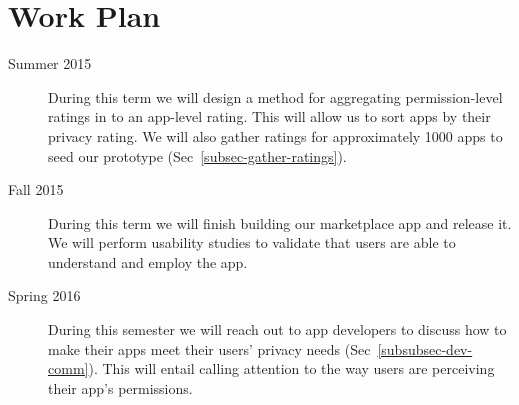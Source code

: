 \documentclass[11pt]{article}
\begin{document}
\section{Work Plan}

\begin{description}

\item[Summer 2015]
During this term we will design a method for aggregating 
permission-level ratings in to an app-level rating. 
This will allow us to sort apps by their privacy rating.
We will also gather ratings for approximately 1000 apps 
to seed our prototype (Sec~\ref{subsec-gather-ratings}).


\item[Fall 2015]
During this term we will finish building our marketplace 
app and release it. We will perform usability studies to
validate that users are able to understand and employ
the app.

\item[Spring 2016] 
During this semester we will reach out to app developers to discuss
how to make their apps meet their users' privacy needs 
(Sec~\ref{subsubsec-dev-comm}). This will entail
calling attention to the way users are perceiving their app's
permissions.

\end{description}

\singlespacing
\end{document}
